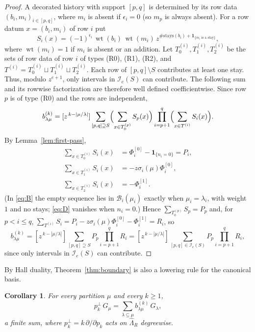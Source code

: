 \documentclass[11pt]{amsart}
\numberwithin{equation}{section}
\newtheorem{corollary}[theorem]{Corollary}
\theoremstyle{definition}
\theoremstyle{remark}
\newcommand{\hLam}{\widehat\Lambda}
\newcommand{\wt}{\operatorname{wt}}
\newcommand{\ind}{\mathbf 1}
\newcommand{\cI}{\mathcal I}
\newcommand{\cB}{\mathcal B}
\begin{document}
\begin{proof}
A decorated history with support $[p,q]$ is determined by its row data
$(b_i,m_i)_{i\in[p,q]}$, where $m_i$ is absent if $\epsilon_i=0$ (so $m_p$ is
always absent). For a row datum $x=(b_i,m_i)$ of row $i$ put
\[
 S_i(x)=(-1)^{\epsilon_i}\,\wt(b_i)\,\wt(m_i)\,
 z^{\#\mathrm{stays}(b_i)+\ind_{\{m_i\text{ is a stay}\}}},
\]
where $\wt(m_i)=1$ if $m_i$ is absent or an addition. Let $T^{(i)}_0,T^{(i)}_1,T^{(i)}_2$
be the sets of row data of row $i$ of types \textup{(R0)}, \textup{(R1)},
\textup{(R2)}, and $T^{(i)}=T^{(i)}_0\sqcup T^{(i)}_1\sqcup T^{(i)}_2$. Each row of $[p,q]\setminus S$ contributes at least one stay.
Thus, modulo $z^{e+1}$, only intervals in $\cI_e(S)$ can
contribute. The following sum and its rowwise factorization
are therefore well defined coefficientwise. Since row $p$
is of type \textup{(R0)} and the rows are independent,
\begin{equation}\label{eq:A}
 b^{(k)}_{\lambda\mu}=[z^{\,k-|\mu/\lambda|}]\sum_{[p,q]\supseteq S}
 \Bigl(\sum_{x\in T^{(p)}_0}S_p(x)\Bigr)\prod_{i=p+1}^{q}\Bigl(\sum_{x\in T^{(i)}}S_i(x)\Bigr).
\end{equation}
By Lemma~\ref{lem:first-pass},
\begin{align}
 \sum_{x\in T^{(i)}_0}S_i(x)&=\Phi^{[0]}_i-\ind_{\{n_i=0\}}=P_i, \label{eq:B}\\
 \sum_{x\in T^{(i)}_1}S_i(x)&=-z\sigma_i(\mu)\Phi^{[0]}_i, \label{eq:C}\\
 \sum_{x\in T^{(i)}_2}S_i(x)&=-\Phi^{[1]}_i. \label{eq:D}
\end{align}
(In \eqref{eq:B} the empty sequence lies in $\cB_i(\mu_i)$ exactly when $\mu_i=\lambda_i$,
with weight $1$ and no stays; \eqref{eq:D} vanishes when $n_i=0$.) Hence
$\sum_{T^{(p)}_0}S_p=P_p$ and, for $p<i\leq q$, $\sum_{T^{(i)}}S_i=P_i-z\sigma_i(\mu)\Phi^{[0]}_i-\Phi^{[1]}_i=R_i$,
so
\[
 b^{(k)}_{\lambda\mu}=[z^{\,k-|\mu/\lambda|}]\sum_{[p,q]\supseteq S}P_p\prod_{i=p+1}^qR_i=[z^{\,k-|\mu/\lambda|}]\sum_{[p,q]\in \cI_e(S) }P_p\prod_{i=p+1}^qR_i,
\]
since only intervals in $\cI_e(S)$ can
contribute.
\end{proof}

By Hall duality, Theorem~\ref{thm:boundary} is also a lowering rule for the
canonical basis.

\begin{corollary}\label{cor:G-lowering}
For every partition $\mu$ and every $k\geq1$,
\[
 p_k^\perp\,G_\mu=\sum_{\lambda\subseteq\mu}b^{(k)}_{\lambda\mu}\,G_\lambda ,
\]
a finite sum, where $p_k^\perp=k\,\partial/\partial p_k$ acts on $\hLam_R$
degreewise.
\end{corollary}
\end{document}
